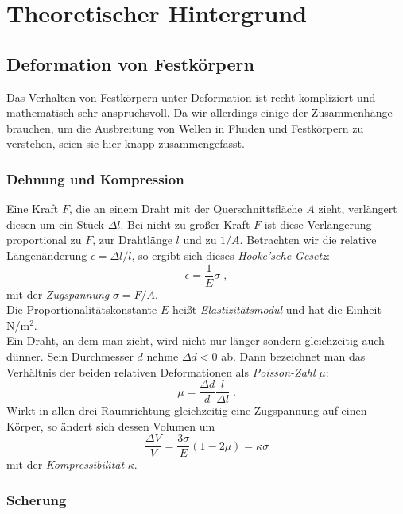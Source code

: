 \section{Theoretischer Hintergrund}

\subsection{Deformation von Festkörpern}

Das Verhalten von Festkörpern unter Deformation ist recht kompliziert und mathematisch sehr anspruchsvoll. Da wir allerdings einige der Zusammenhänge brauchen, um die Ausbreitung von Wellen in Fluiden und Festkörpern zu verstehen, seien sie hier knapp zusammengefasst.

\subsubsection{Dehnung und Kompression}

Eine Kraft $F$, die an einem Draht mit der Querschnittsfläche $A$ zieht, verlängert diesen um ein Stück $\Delta l$. Bei nicht zu großer Kraft $F$ ist diese Verlängerung proportional zu $F$, zur Drahtlänge $l$ und zu $1/A$. Betrachten wir die relative Längenänderung $\epsilon = \Delta l/l$, so ergibt sich dieses \textit{Hooke'sche Gesetz}:
\begin{equation}
	\epsilon=\frac{1}{E}\sigma\; ,
\end{equation}
mit der \textit{Zugspannung} $\sigma=F/A$.\\
Die Proportionalitätskonstante $E$ heißt \textit{Elastizitätsmodul} und hat die Einheit N/m$^2$.\\
Ein Draht, an dem man zieht, wird nicht nur länger sondern gleichzeitig auch dünner. Sein Durchmesser $d$ nehme $\Delta d < 0$ ab. Dann bezeichnet man das Verhältnis der beiden relativen Deformationen als \textit{Poisson-Zahl} $\mu$:
\begin{equation}
	\mu = \frac{\Delta d}{d}\frac{l}{\Delta l}\; .
\end{equation}
Wirkt in allen drei Raumrichtung gleichzeitig eine Zugspannung auf einen Körper, so ändert sich dessen Volumen um
\begin{equation}
	\frac{\Delta V}{V} = \frac{3 \sigma}{E}\left( 1-2\mu\right) = \kappa\sigma
\end{equation}
mit der \textit{Kompressibilität} $\kappa$.

\subsubsection{Scherung}

